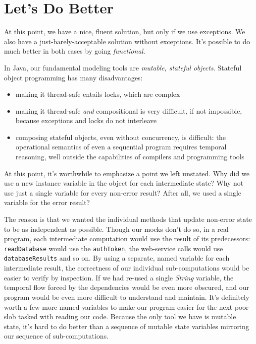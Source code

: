 \documentclass[11pt]{article}
\begin{document}
\section{Let's Do Better}
\label{sec-3}

At this point, we have a nice, fluent solution, but only if we use
exceptions. We also have a just-barely-acceptable solution without
exceptions. It's possible to do much better in both cases by
going \emph{functional}.

In Java, our fundamental modeling tools are \emph{mutable, stateful
objects}. Stateful object programming has many disadvantages:
\begin{itemize}
\item making it thread-safe entails locks, which are complex
\item making it thread-safe \emph{and} compositional is very difficult, if
not impossible, because exceptions and locks do not interleave
\item composing stateful objects, even without concurrency, is
difficult: the operational semantics of even a sequential program
requires temporal reasoning, well outside the capabilities of
compilers and programming tools
\end{itemize}

At this point, it's worthwhile to emphasize a point we left
unstated. Why did we use a new instance variable in the object for
each intermediate state? Why not use just a single variable for
every non-error result? After all, we used a single variable for
the error result?

The reason is that we wanted the individual methods that update
non-error state to be as independent as possible. Though our mocks
don't do so, in a real program, each intermediate computation would
use the result of its predecessors: \verb|readDatabase| would use
the \verb|authToken|, the web-service calls would use
\verb|databaseResults| and so on. By using a separate, named
variable for each intermediate result, the correctness of our
individual sub-computations would be easier to verify by inspection.
If we had re-used a single \emph{String} variable, the temporal flow
forced by the dependencies would be even more obscured, and our
program would be even more difficult to understand and maintain.
It's definitely worth a few more named variables to make our
program easier for the next poor slob tasked with reading our code.
Because the only tool we have is mutable state, it's hard to do
better than a sequence of mutable state variables mirroring our
sequence of sub-computations.
\end{document}
